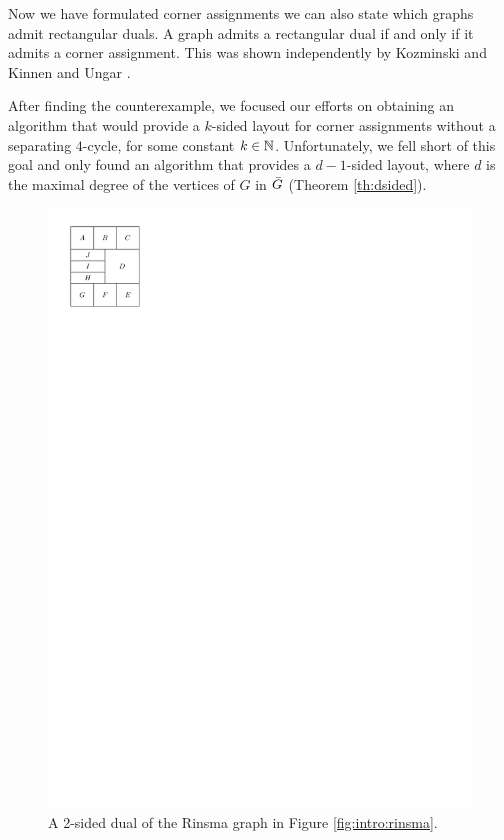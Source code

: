   Now we have formulated corner assignments we can also state which graphs admit rectangular duals.
  A graph admits a rectangular dual if and only if it admits a corner assignment.
  This was shown independently by Kozminski and Kinnen \cite{Kozminski1984} and Ungar \cite{Ungar1953}.

  After finding the counterexample, we focused our efforts on obtaining an algorithm that would provide a $k$-sided layout for corner assignments without a separating $4$-cycle, for some constant $k \in \mathbb{N}$.
  Unfortunately, we fell short of this goal and only found an algorithm that provides a $d-1$-sided layout, where $d$ is the maximal degree of the vertices of $G$ in $\bar{G}$ (Theorem \ref{th:dsided}).

  \begin{figure} %
    \centering
    \includegraphics[]{introduction/img/rinsma2Sided.pdf}
    \caption{A 2-sided dual of the Rinsma graph in Figure \ref{fig:intro:rinsma}.}
    \label{fig:intro:rinsma2Sided}
  \end{figure}

